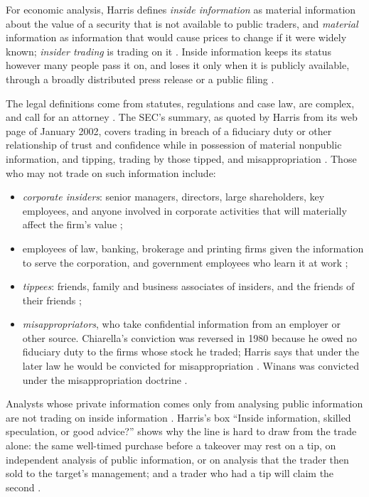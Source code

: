 \begin{qfdefinition}\label{def:inside-information}
 For economic analysis, Harris defines \emph{inside information} as material information about the value of a security that is not available to public traders, and \emph{material} information as information that would cause prices to change if it were widely known; \emph{insider trading} is trading on it \citep[chap.~``Insider Trading'', sec.~29.1, p.~584]{alpha-harris}. Inside information keeps its status however many people pass it on, and loses it only when it is publicly available, through a broadly distributed press release or a public filing \citep[same sec., p.~585]{alpha-harris}.

The legal definitions come from statutes, regulations and case law, are complex, and call for an attorney \citep[same sec., p.~584]{alpha-harris}. The SEC's summary, as quoted by Harris from its web page of January 2002, covers trading in breach of a fiduciary duty or other relationship of trust and confidence while in possession of material nonpublic information, and tipping, trading by those tipped, and misappropriation \citep[same sec., box, p.~585]{alpha-harris}. Those who may not trade on such information include:
\begin{itemize}
\item \emph{corporate insiders}: senior managers, directors, large shareholders, key employees, and anyone involved in corporate activities that will materially affect the firm's value \citep[sec.~29.1.1, p.~587]{alpha-harris};
\item employees of law, banking, brokerage and printing firms given the information to serve the corporation, and government employees who learn it at work \citep[sec.~29.1, box, p.~585]{alpha-harris};
\item \emph{tippees}: friends, family and business associates of insiders, and the friends of their friends \citep[same sec., pp.~584--585]{alpha-harris};
\item \emph{misappropriators}, who take confidential information from an employer or other source. Chiarella's conviction was reversed in 1980 because he owed no fiduciary duty to the firms whose stock he traded; Harris says that under the later law he would be convicted for misappropriation \citep[same sec., box, p.~586]{alpha-harris}. Winans was convicted under the misappropriation doctrine \citep[same sec., box, p.~587]{alpha-harris}.
\end{itemize}
Analysts whose private information comes only from analysing public information are not trading on inside information \citep[same sec., p.~585]{alpha-harris}. Harris's box ``Inside information, skilled speculation, or good advice?'' shows why the line is hard to draw from the trade alone: the same well-timed purchase before a takeover may rest on a tip, on independent analysis of public information, or on analysis that the trader then sold to the target's management; and a trader who had a tip will claim the second \citep[sec.~29.2, box, p.~590]{alpha-harris}.


\end{qfdefinition}
